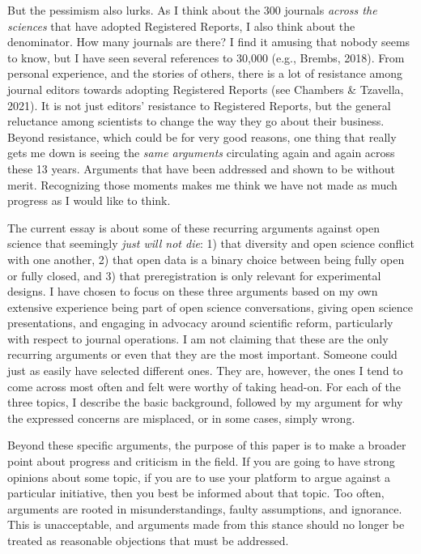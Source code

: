 \documentclass[authordate, empirical,issue]{jote-new-article}
\begin{document}
But the pessimism also lurks. As I think about the 300 journals \emph{across the sciences} that have adopted Registered Reports, I also think about the denominator. How many journals are there? I find it amusing that nobody seems to know, but I have seen several references to 30,000 (e.g., Brembs, 2018). From personal experience, and the stories of others, there is a lot of resistance among journal editors towards adopting Registered Reports (see Chambers \& Tzavella, 2021). It is not just editors' resistance to Registered Reports, but the general reluctance among scientists to change the way they go about their business. Beyond resistance, which could be for very good reasons, one thing that really gets me down is seeing the \emph{same arguments} circulating again and again across these 13 years. Arguments that have been addressed and shown to be without merit. Recognizing those moments makes me think we have not made as much progress as I would like to think.







The current essay is about some of these recurring arguments against open science that seemingly\emph{ just will not die}: 1) that diversity and open science conflict with one another, 2) that open data is a binary choice between being fully open or fully closed, and 3) that preregistration is only relevant for experimental designs. I have chosen to focus on these three arguments based on my own extensive experience being part of open science conversations, giving open science presentations, and engaging in advocacy around scientific reform, particularly with respect to journal operations. I am not claiming that these are the only recurring arguments or even that they are the most important. Someone could just as easily have selected different ones. They are, however, the ones I tend to come across most often and felt were worthy of taking head-on. For each of the three topics, I describe the basic background, followed by my argument for why the expressed concerns are misplaced, or in some cases, simply wrong.







Beyond these specific arguments, the purpose of this paper is to make a broader point about progress and criticism in the field. If you are going to have strong opinions about some topic, if you are to use your platform to argue against a particular initiative, then you best be informed about that topic. Too often, arguments are rooted in misunderstandings, faulty assumptions, and ignorance. This is unacceptable, and arguments made from this stance should no longer be treated as reasonable objections that must be addressed.
\end{document}
